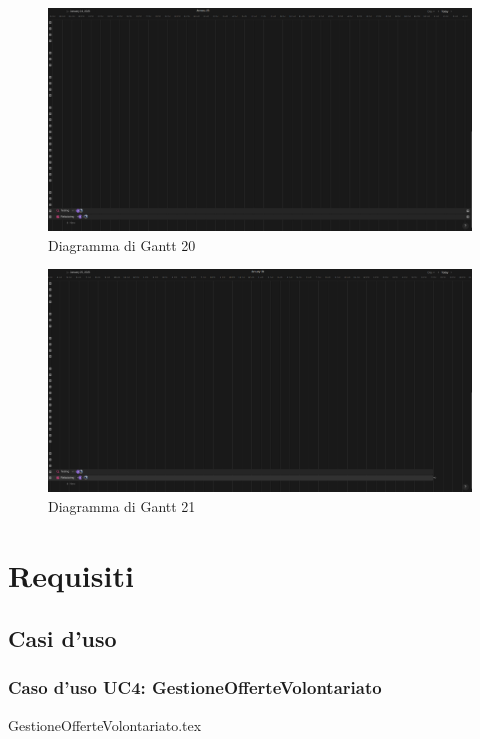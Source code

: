 \documentclass[12pt]{article}
\begin{document}
\begin{figure}[H]
    \includegraphics[width=\textwidth,keepaspectratio]{Immagini/Gantt/Iterazione 2/Gantt20.png}
        \caption{Diagramma di Gantt 20} 
        \label{fig:Gantt20}
\end{figure}

\begin{figure}[H]
    \includegraphics[width=\textwidth,keepaspectratio]{Immagini/Gantt/Iterazione 2/Gantt21.png}
        \caption{Diagramma di Gantt 21} 
        \label{fig:Gantt21}
\end{figure}

\section{Requisiti}

\subsection{Casi d'uso}

\subsubsection{Caso d'uso UC4: GestioneOfferteVolontariato}
{GestioneOfferteVolontariato.tex}
\end{document}
